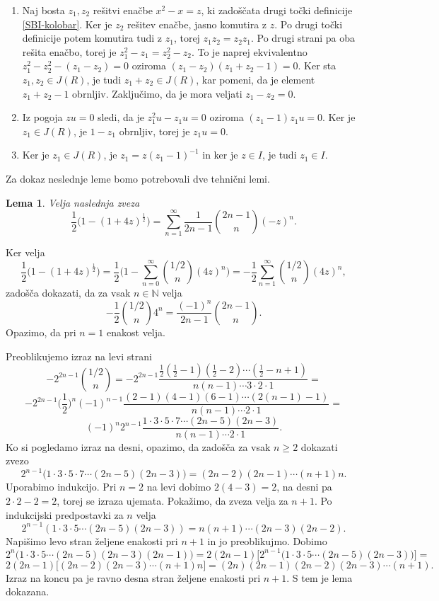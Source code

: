 \documentclass[a4paper, 12pt]{amsart}
\theoremstyle{definition} %
\theoremstyle{plain} %
\newtheorem{lema}[definicija]{Lema}
\newcommand{\N}{\mathbb N}
\begin{document}
\proof
\begin{enumerate}
\item Naj bosta $z_1, z_2$ rešitvi enačbe $x^2 -x = z$, ki zadoščata drugi točki definicije \ref{SBI-kolobar}. Ker je $z_2$ rešitev enačbe, jasno komutira z $z$. Po drugi točki definicije potem komutira tudi z $z_1$, torej $z_1 z_2 = z_2 z_1$. Po drugi strani pa oba rešita enačbo, torej je $z_1^2 - z_1 = z_2^2 - z_2$. To je naprej ekvivalentno $z_1^2 - z_2^2 - (z_1 - z_2) = 0$ oziroma $(z_1 - z_2)(z_1 +z_2 -1)=0$. Ker sta $z_1, z_2\in J(R)$, je tudi $z_1 + z_2 \in J(R)$, kar pomeni, da je element $z_1 + z_2 - 1$ obrnljiv. Zaključimo, da je mora veljati $z_1 - z_2 = 0$.
\item Iz pogoja $zu = 0$ sledi, da je $z_1^2 u - z_1 u = 0$ oziroma $(z_1 - 1)z_1 u = 0$. Ker je $z_1\in J(R)$, je $1- z_1$ obrnljiv, torej je $z_1 u = 0$.  
\item Ker je $z_1 \in J(R)$, je $z_1 = z(z_1 - 1)^{-1}$ in ker je $z\in I$, je tudi $z_1 \in I$.
\end{enumerate}
\endproof

Za dokaz neslednje leme bomo potrebovali dve tehnični lemi.
\begin{lema}
\label{SBItehnicna1}
Velja naslednja zveza
$$
\frac{1}{2}\big( 1- (1+4z)^{\frac{1}{2}}\big) = \sum_{n=1}^{\infty} \frac{1}{2n-1} \binom{2n-1}{n}(-z)^n.
$$
\end{lema}

\proof
Ker velja 
$$
\frac{1}{2}\big( 1- (1+4z)^{\frac{1}{2}}\big) = \frac{1}{2}\big( 1 - \sum_{n=0}^{\infty} {1/2 \choose n} (4z)^n \big) = -\frac{1}{2} \sum_{n=1}^{\infty} {1/2 \choose n} (4z)^n,
$$
zadošča dokazati, da za vsak $n\in \N$ velja
$$
-\frac{1}{2} {1/2 \choose n} 4^n = \frac{(-1)^n}{2n-1} {2n-1 \choose n}.
$$
Opazimo, da pri $n=1$ enakost velja.

Preoblikujemo izraz na levi strani
$$
-2^{2n-1} {1/2 \choose n} = -2^{2n-1} \frac{\frac{1}{2}(\frac{1}{2}-1)(\frac{1}{2} - 2)\cdots(\frac{1}{2} - n+1) }{n(n-1)\cdots 3 \cdot 2 \cdot 1} =
$$
$$
-2^{2n-1}\big(\frac{1}{2}\big)^n (-1)^{n-1} \frac{(2-1)(4-1)(6-1)\cdots (2(n-1)-1)}{n(n-1)\cdots 2 \cdot1} = 
$$
$$
(-1)^n 2^{n-1} \frac{1\cdot 3 \cdot 5 \cdot 7 \cdots (2n-5)(2n-3)}{n(n-1)\cdots 2\cdot1}.
$$
Ko si pogledamo izraz na desni, opazimo, da zadošča za vsak $n\ge 2$ dokazati zvezo
$$
2^{n-1}\big( 1\cdot 3 \cdot 5 \cdot 7 \cdots(2n-5)(2n-3)   \big) = (2n-2) (2n-1) \cdots (n+1) n.
$$
Uporabimo indukcijo. Pri $n=2$ na levi dobimo $2(4-3) = 2$, na desni pa $2\cdot 2 - 2 = 2$, torej se izraza ujemata. Pokažimo, da zveza velja za $n+1$. Po indukcijski predpostavki za $n$ velja 
$$
2^{n-1} (1\cdot 3\cdot 5 \cdots (2n-5)(2n-3)) = n(n+1)\cdots (2n-3)(2n-2).
$$
Napišimo levo stran željene enakosti pri $n+1$ in jo preoblikujmo. Dobimo
$$
2^n \big(1\cdot 3 \cdot 5 \cdots (2n-5)(2n-3)(2n-1)\big) = 2(2n-1) \big[2^{n-1}\big(1\cdot 3 \cdot 5 \cdots (2n-5)(2n-3) \big)\big]=
$$
$$
2(2n-1) \big[(2n-2)(2n-3)\cdots(n+1)n\big] = (2n)(2n-1)(2n-2)(2n-3)\cdots (n+1).
$$
Izraz na koncu pa je ravno desna stran željene enakosti pri $n+1$. S tem je lema dokazana.
\endproof
\end{document}

